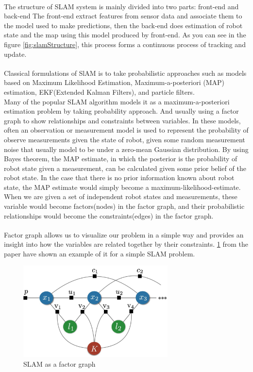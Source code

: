 \documentclass[12pt,twoside]{article}
\begin{document}
\\The structure of SLAM system is mainly divided into two parts: front-end and back-end
The front-end extract features from sensor data and associate them to the model used to make predictions, then the back-end does estimation of robot state and the map using this model produced by front-end. As you can see in the figure \ref{fig:slamStructure}, this process forms a continuous process of tracking and update.\\
\\
Classical formulations of SlAM is to take probabilistic approaches such as models based on Maximum Likelihood Estimation, Maximum-a-posteriori (MAP) estimation, EKF(Extended Kalman Filters), and particle filters.\\
Many of the popular SLAM algorithm models it as a maximum-a-posteriori estimation problem  by taking probability approach. And usually using a factor graph to show relationships and constraints between variables. In these models, often an observation or measurement model is used to represent the probability of observe measurements given the state of robot, given some random measurement noise that usually model to be under a zero-mean Gaussian distribution. By using Bayes theorem, the MAP estimate, in which the posterior is the probability of robot state given a measurement, can be calculated given some prior belief of the robot state. In the case that there is no prior information known about robot state, the MAP estimate would simply become a maximum-likelihood-estimate. When we are given a set of independent robot states and measurements, these variable would become factors(nodes) in the factor graph, and their probabilistic relationships would become the constraints(edges) in the factor graph.\\
\\
Factor graph allows us to visualize our problem in a simple way and provides an insight into how the variables are related together by their constraints. \ref{fig:factorgraph} from the paper have shown an example of it for a simple SLAM problem.
\\
\begin{figure}[h]
    \centering
    \includegraphics[width=0.7\textwidth]{figures/factorgraph}
    \caption{SLAM as a factor graph\cite{cadena2016past}}
    \label{fig:factorgraph}
\end{figure}
\end{document}
